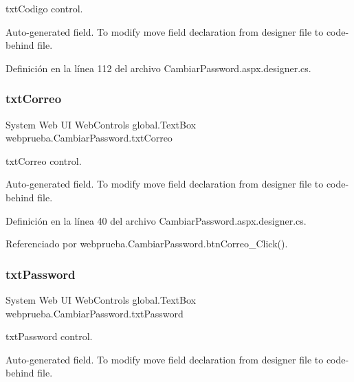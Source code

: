 txt\+Codigo control. 

Auto-\/generated field. To modify move field declaration from designer file to code-\/behind file. 

Definición en la línea 112 del archivo Cambiar\+Password.\+aspx.\+designer.\+cs.

\mbox{\label{classwebprueba_1_1_cambiar_password_a1c9b7aa721934e24d4db613ee9e24690}} 
\subsubsection{\texorpdfstring{txtCorreo}{txtCorreo}}
{\footnotesize\ttfamily System Web UI Web\+Controls global.\+Text\+Box webprueba.\+Cambiar\+Password.\+txt\+Correo\hspace{0.3cm}{\ttfamily [protected]}}



txt\+Correo control. 

Auto-\/generated field. To modify move field declaration from designer file to code-\/behind file. 

Definición en la línea 40 del archivo Cambiar\+Password.\+aspx.\+designer.\+cs.



Referenciado por webprueba.\+Cambiar\+Password.\+btn\+Correo\+\_\+\+Click().

\mbox{\label{classwebprueba_1_1_cambiar_password_af63494732a261ab56a7acbe72b1a1878}} 
\subsubsection{\texorpdfstring{txtPassword}{txtPassword}}
{\footnotesize\ttfamily System Web UI Web\+Controls global.\+Text\+Box webprueba.\+Cambiar\+Password.\+txt\+Password\hspace{0.3cm}{\ttfamily [protected]}}



txt\+Password control. 

Auto-\/generated field. To modify move field declaration from designer file to code-\/behind file. 

